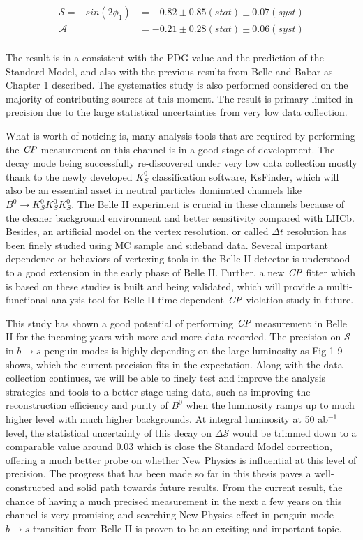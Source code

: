 \begin{equation}
\begin{split}
\mathcal{S}=- sin(2\phi_1) & = -0.82 \pm 0.85(stat) \pm 0.07(syst) \\
\mathcal{A} & = -0.21\pm 0.28(stat) \pm 0.06(syst)\\
\end{split}
\end{equation}  


 The result is in a consistent with the PDG value and the prediction of the Standard Model, and also with the previous results from Belle and Babar as Chapter 1 described. The systematics study is also performed considered on the majority of contributing sources at this moment. The result is primary limited in precision due to the large statistical uncertainties from very low data collection. 
 
 What is worth of noticing is, many analysis tools that are required by performing the $\it{CP}$ measurement on this channel is in a good stage of development. The decay mode being successfully re-discovered under very low data collection mostly thank to the newly developed $K_S^0$ classification software, KsFinder, which will also be an essential asset in neutral particles dominated channels like $B^0 \to K_S^0  K_S^0  K_S^0$. The Belle II experiment is crucial in these channels because of the cleaner background environment and better sensitivity compared with LHCb. Besides, an artificial model on the vertex resolution, or called $\Delta t$ resolution has been finely studied using MC sample and sideband data. Several important dependence or behaviors of vertexing tools in the Belle II detector is understood to a good extension in the early phase of Belle II. Further, a new $\it{CP}$ fitter which is based on these studies is built and being validated, which will provide a multi-functional analysis tool for Belle II time-dependent $\it{CP}$ violation study in future. 
 
 This study has shown a good potential of performing $\it{CP}$ measurement in Belle II for the incoming years with more and more data recorded. The precision on $\mathcal{S}$ in $b\to s$ penguin-modes is highly depending on the large luminosity as Fig 1-9 shows, which the current precision fits in the expectation. Along with the data collection continues, we will be able to finely test and improve the analysis strategies and tools to a better stage using data, such as improving the reconstruction efficiency and purity of $B^0$ when the luminosity ramps up to much higher level with much higher backgrounds. At integral luminosity at 50 ab$^{-1}$ level, the statistical uncertainty of this decay on $\Delta \mathcal{S}$ would be trimmed down to a comparable value around $0.03$ which is close the Standard Model correction, offering a much better probe on whether New Physics is influential at this level of precision. The progress that has been made so far in this thesis paves a well-constructed and solid path towards future results.
 From the current result, the chance of having a much precised measurement in the next a few years on this channel is very promising and searching New Physics effect in penguin-mode $b\to s$ transition from Belle II is proven to be an exciting and important topic. 
 
 

